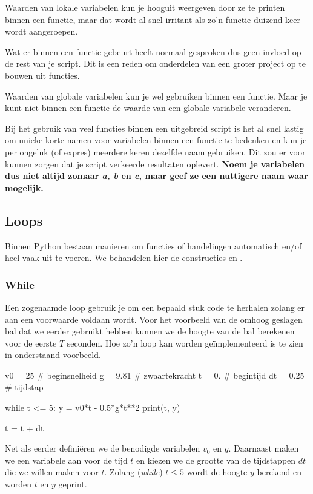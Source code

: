 \documentclass[a4paper,11pt, fleqn]{article}
\begin{document}
Waarden van lokale variabelen kun je hooguit weergeven door ze te printen binnen een functie, maar dat wordt al snel irritant als zo'n functie duizend keer wordt aangeroepen. 

Wat er binnen een functie gebeurt heeft normaal gesproken dus geen invloed op de rest van je script. Dit is een reden om onderdelen van een groter project op te bouwen uit functies.

Waarden van globale variabelen kun je wel gebruiken binnen een functie. Maar je kunt niet binnen een functie de waarde van een globale variabele veranderen.

Bij het gebruik van veel functies binnen een uitgebreid script is het al snel lastig om unieke korte namen voor variabelen binnen een functie te bedenken en kun je per ongeluk (of expres) meerdere keren dezelfde naam gebruiken. Dit zou er voor kunnen zorgen dat je script verkeerde resultaten oplevert. {\bf Noem je variabelen dus niet altijd zomaar \textit{a, b} en \textit{c}, maar geef ze een nuttigere naam waar mogelijk.}

\subsection{Loops}
Binnen Python bestaan manieren om functies of handelingen automatisch en/of heel vaak uit te voeren. We behandelen hier de constructies  en .

\subsubsection{While}
Een zogenaamde  loop gebruik je om een bepaald stuk code te herhalen zolang er aan een voorwaarde voldaan wordt. Voor het voorbeeld van de omhoog geslagen bal dat we eerder gebruikt hebben kunnen we de hoogte van de bal berekenen voor de eerste $T$ seconden. Hoe zo'n loop kan worden ge\"implementeerd is te zien in onderstaand voorbeeld.

\begin{python}
v0 = 25   # beginsnelheid
g = 9.81  # zwaartekracht
t = 0.    # begintijd
dt = 0.25 # tijdstap

while t <= 5:
    y = v0*t - 0.5*g*t**2
    print(t, y)
    
    t = t + dt
\end{python}

Net als eerder defini\"eren we de benodigde variabelen $v_0$ en $g$. Daarnaast maken we een variabele aan voor de tijd $t$ en kiezen we de grootte van de tijdstappen $dt$ die we willen maken voor $t$. Zolang (\textit{while}) $t \leq 5$ wordt de hoogte $y$ berekend en worden $t$ en $y$ geprint.
\end{document}
